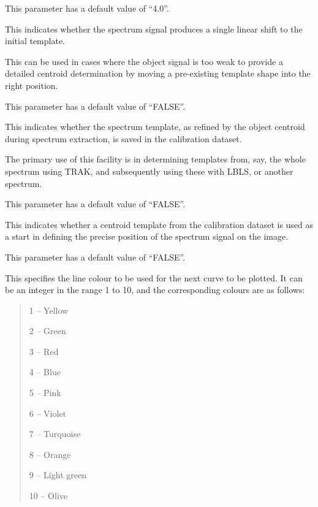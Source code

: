 \begin {description}
This parameter has a default value of ``4.0''.

\item [CENSH=boolean]
This indicates whether the spectrum signal produces a single linear
shift to the initial template.

This can be used in cases where the object signal is too weak
to provide a detailed centroid determination by moving a pre-existing
template shape into the right position.

This parameter has a default value of ``FALSE''.

\item [CENSV=boolean]
This indicates whether the spectrum template, as refined by the
object centroid during spectrum extraction, is saved in the calibration
dataset.

The primary use of this facility is in determining templates from,
say, the whole spectrum using TRAK, and subsequently using these
with LBLS, or another spectrum.

This parameter has a default value of ``FALSE''.

\item [CENTM=boolean]
This indicates whether a centroid template from the calibration dataset
is used as a start in defining the precise position of the spectrum
signal on the image.

This parameter has a default value of ``FALSE''.

\item [COL=number]
This specifies the line colour to be used for the next curve to be
plotted.
It can be an integer in the range 1 to 10, and the corresponding
colours are as follows:

\begin {quote}
\begin {description}
\item 1 -- Yellow
\item 2 -- Green
\item 3 -- Red
\item 4 -- Blue
\item 5 -- Pink
\item 6 -- Violet
\item 7 -- Turquoise
\item 8 -- Orange
\item 9 -- Light green
\item 10 -- Olive
\end {description}
\end {quote}


\end{description}
